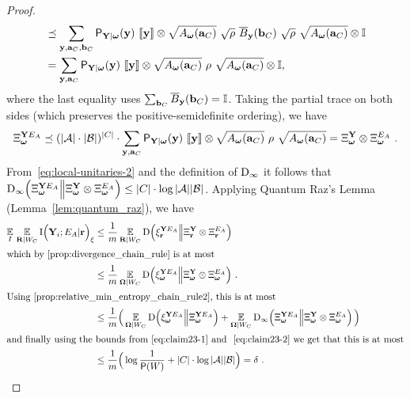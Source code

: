 \begin{proof}
\begin{align}
		&\preceq  \sum_{\mathbf{y}, \mathbf{a}_C, \mathbf{b}_C} \mathsf{P}_{\mathbf{Y} | {\boldsymbol{\omega}}}(\mathbf{y}) \,\, \llbracket \mathbf{y} \rrbracket \otimes \sqrt{A_{\boldsymbol{\omega}}(\mathbf{a}_C)} \,\, \sqrt{\rho} \,\, \overline{B}_{\mathbf{y}}(\mathbf{b}_C) \,\, \sqrt{\rho} \,\, \sqrt{A_{\boldsymbol{\omega}}(\mathbf{a}_C)} \otimes \mathbb{I} \notag\\
		&= \sum_{\mathbf{y}, \mathbf{a}_C} \mathsf{P}_{\mathbf{Y} | {\boldsymbol{\omega}}}(\mathbf{y}) \,\, \llbracket \mathbf{y} \rrbracket \otimes \sqrt{A_{\boldsymbol{\omega}}(\mathbf{a}_C)} \,\,\rho\,\, \sqrt{A_{\boldsymbol{\omega}}(\mathbf{a}_C)} \otimes \mathbb{I} \label{eq:claim23-2},
	\end{align}
where the last equality uses $\sum_{\mathbf{b}_C} \overline{B}_{\mathbf{y}}(\mathbf{b}_C) = \mathbb{I}$. Taking the partial trace on both sides (which preserves the positive-semidefinite ordering), we have
\begin{align}
\label{eq:local-unitaries-2}
\Xi_{\boldsymbol{\omega}}^{\mathbf{Y} E_A} \preceq (|\mathcal{A}|\cdot |\mathcal{B}|)^{|C|} \cdot \sum_{\mathbf{y}, \mathbf{a}_C} \mathsf{P}_{\mathbf{Y} | {\boldsymbol{\omega}}}(\mathbf{y}) \,\, \llbracket \mathbf{y} \rrbracket \otimes \sqrt{A_{\boldsymbol{\omega}}(\mathbf{a}_C)} \,\,\rho\,\, \sqrt{A_{\boldsymbol{\omega}}(\mathbf{a}_C)} = \Xi_{{\boldsymbol{\omega}}}^{\mathbf{Y}} \otimes \Xi_{{\boldsymbol{\omega}}}^{E_A}~.
\end{align}
	From~\eqref{eq:local-unitaries-2} and the definition of $\mathrm{D}_\infty$ it follows that $\mathrm{D}_\infty \Big (\Xi_{{\boldsymbol{\omega}}}^{\mathbf{Y} E_A} \Big \| \Xi_{{\boldsymbol{\omega}}}^{\mathbf{Y}} \otimes \Xi_{{\boldsymbol{\omega}}}^{E_A} \Big ) \leq |C| \cdot \log |\mathcal{A}| |\mathcal{B}|$. 
Applying Quantum Raz's Lemma (Lemma~\ref{lem:quantum_raz}), we have
\begin{align}
		\Ex_I \,  \Ex_{\bR | W_C} \I \Big (\bY_i ; E_A | \br \Big )_{\xi} &\leq 		\frac{1}{m} \Ex_{\bR | W_C} \D \Big (\xi_{\br}^{\bY E_A} \Big \| \Xi_{\br}^{\bY} \otimes \Xi_{\br}^{E_A} \Big )\notag\\
	\intertext{which by \Cref{prop:divergence_chain_rule} is at most}
		&\leq \frac{1}{m} \Ex_{\bOmega | W_C} \D \Big (\xi_{\bomega}^{\bY E_A} \Big \| \Xi_{\bomega}^{\bY} \otimes \Xi_{\bomega}^{E_A} \Big )~.\notag \\
	\intertext{Using \Cref{prop:relative_min_entropy_chain_rule2}, this is at most}
		&\leq 		\frac{1}{m} \Big(\Ex_{\bOmega | W_C} \D \Big (\xi_{\bomega}^{\bY E_A} \Big \| \Xi_{\bomega}^{\bY E_A} \Big) + \Ex_{\bOmega | W_C} \D_\infty \Big (\Xi_{\bomega}^{\bY E_A} \Big \| \Xi_{\bomega}^{\bY} \otimes \Xi_{\bomega}^{E_A} \Big) \, \Big)\notag\\
	\intertext{and finally using the bounds from~\eqref{eq:claim23-1} and ~\eqref{eq:claim23-2} we get that this is at most}
		&\leq \frac{1}{m}\Big(\log \frac{1}{\P(W)} +  |C| \cdot \log |\A| |\B|\Big) = \delta~. \label{eq:claim23-3}
\end{align}

\end{proof}
